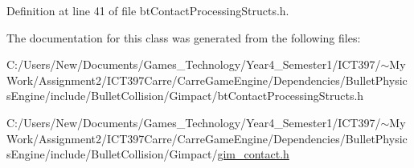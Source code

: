 Definition at line 41 of file btContactProcessingStructs.h.

The documentation for this class was generated from the following files:\begin{CompactItemize}
\item 
C:/Users/New/Documents/Games\_\-Technology/Year4\_\-Semester1/ICT397/$\sim$My Work/Assignment2/ICT397Carre/CarreGameEngine/Dependencies/BulletPhysicsEngine/include/BulletCollision/Gimpact/btContactProcessingStructs.h\item 
C:/Users/New/Documents/Games\_\-Technology/Year4\_\-Semester1/ICT397/$\sim$My Work/Assignment2/ICT397Carre/CarreGameEngine/Dependencies/BulletPhysicsEngine/include/BulletCollision/Gimpact/\hyperlink{gim__contact_8h}{gim\_\-contact.h}\end{CompactItemize}
